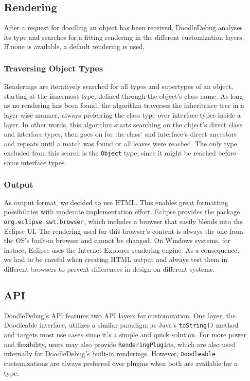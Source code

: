 \documentclass[english]{scrartcl}
\newcommand{\DD}{Dood\-le\-De\-bug\xspace}
\begin{document}
\subsection{Rendering}
After a request for doodling an object has been received, \DD analyses its type and searches for a fitting rendering in the different customization layers.
If none is available, a default rendering is used.

\subsubsection{Traversing Object Types}
Renderings are iteratively searched for all types and supertypes of an object, starting at the innermost type, defined through the object's class name.
As long as no rendering has been found, the algorithm traverses the inheritance tree in a layer-wise manner, always preferring the class type over interface types inside a layer.
In other words, this algorithm starts searching on the object's direct class and interface types, then goes on for the class' and interface's direct ancestors and repeats until a match was found or all leaves were reached.
The only type excluded from this search is the \texttt{Object} type, since it might be reached before some interface types.

\subsubsection{Output}
As output format, we decided to use HTML.
This enables great formatting possibilities with moderate implementation effort.
Eclipse provides the package \texttt{org.eclipse.swt.browser}, which includes a browser that easily blends into the Eclipse UI.
The rendering used for this browser's content is always the one from the OS's built-in browser and cannot be changed.
On Windows systems, for instace, Eclipse uses the Internet Explorer rendering engine.
As a consequence, we had to be careful when creating HTML output and always test them in different browsers to prevent differences in design on different systems.

\subsection{API}
\DD's API features two API layers for customization.
One layer, the Doodleable interface, utilizes a similar paradigm as Java's \texttt{toString()} method and targets most use cases since it's a simple and quick solution.
For more power and flexibility, users may also provide \texttt{RenderingPlugin}s, which are also used internally for \DD's built-in renderings.
However, \texttt{Doodleable} customizations are always preferred over plugins when both are available for a type.
\end{document}
